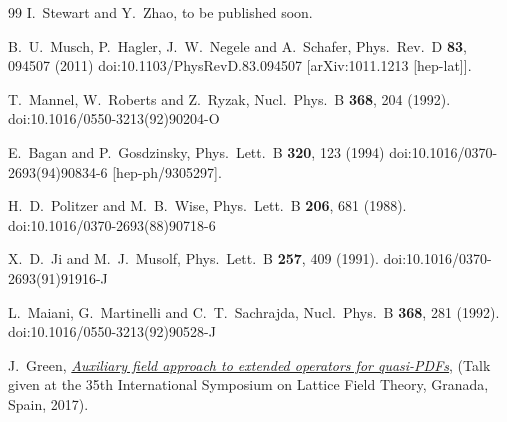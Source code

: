 \begin{thebibliography}{99}
	I.~Stewart and Y.~Zhao,
	to be published soon.


  B.~U.~Musch, P.~Hagler, J.~W.~Negele and A.~Schafer,
  Phys.\ Rev.\ D {\bf 83}, 094507 (2011)
  doi:10.1103/PhysRevD.83.094507
  [arXiv:1011.1213 [hep-lat]].



  T.~Mannel, W.~Roberts and Z.~Ryzak,
  Nucl.\ Phys.\ B {\bf 368}, 204 (1992).
  doi:10.1016/0550-3213(92)90204-O


  E.~Bagan and P.~Gosdzinsky,
  Phys.\ Lett.\ B {\bf 320}, 123 (1994)
  doi:10.1016/0370-2693(94)90834-6
  [hep-ph/9305297].

  H.~D.~Politzer and M.~B.~Wise,
  Phys.\ Lett.\ B {\bf 206}, 681 (1988).
  doi:10.1016/0370-2693(88)90718-6



  X.~D.~Ji and M.~J.~Musolf,
  Phys.\ Lett.\ B {\bf 257}, 409 (1991).
  doi:10.1016/0370-2693(91)91916-J


  L.~Maiani, G.~Martinelli and C.~T.~Sachrajda,
  Nucl.\ Phys.\ B {\bf 368}, 281 (1992).
  doi:10.1016/0550-3213(92)90528-J


  J.~Green,
  {\href{https://makondo.ugr.es/event/0/session/95/contribution/332/material/slides/0.pdf}{\it Auxiliary field approach to extended operators for quasi-PDFs}},
  (Talk given at the 35th International Symposium on Lattice Field Theory, Granada, Spain, 2017).


\end{thebibliography}
